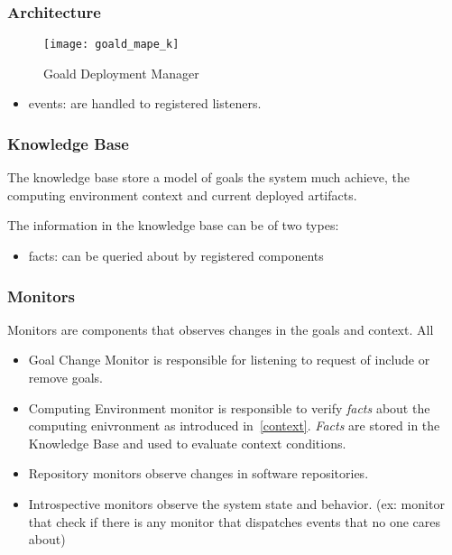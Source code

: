 \subsubsection{Architecture}

\begin{figure}[!htb]
  \centering
  \texttt{[image: goald\_mape\_k]}
  \caption{Goald Deployment Manager}
\label{fig:goald_mape_k}
\end{figure}

\begin{itemize}
  \item events: are handled to registered listeners.
\end{itemize}

\subsubsection{Knowledge Base}

The knowledge base store a model of goals the system much achieve, the computing environment context and current deployed artifacts.

The information in the knowledge base can be of two types:
\begin{itemize}
  \item facts: can be queried about by registered components
\end{itemize}


\subsubsection{Monitors}

Monitors are components that observes changes in the goals and context. All
\begin{itemize}
  \item Goal Change Monitor is responsible for listening to request of include or remove goals.
  \item Computing Environment monitor is responsible to verify \emph{facts} about the computing enivronment as introduced in~\ref{context}. \emph{Facts} are stored in the Knowledge Base and used to evaluate context conditions.
  \item Repository monitors observe changes in software repositories.
  \item Introspective monitors observe the system state and behavior. (ex: monitor that check if there is any monitor that dispatches events that no one cares about)
\end{itemize}

